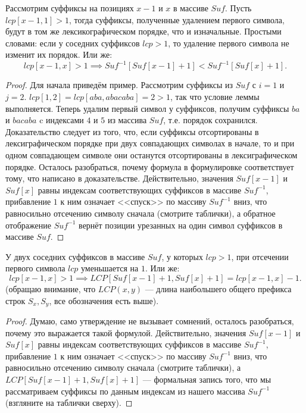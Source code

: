 \begin{enumerate}
       \begin{lemma}
               \label{3.2}
               Рассмотрим суффиксы на позициях $x-1$ и $x$ в массиве $Suf$. 
               Пусть $lcp[x-1, 1] > 1$, тогда суффиксы, полученные удалением первого 
               символа, будут в том же лексикографическом порядке, что и изначальные.
               Простыми словами: если у соседних суффиксов $lcp > 1$, то удаление первого символа не
               изменит их порядок. Или же:
               \[
                       lcp[x-1, x] > 1 \implies Suf^{-1}[Suf[x-1] + 1] < Suf^{-1}[Suf[x] + 1]
               .\] 
       \end{lemma}
       \begin{proof}
               Для начала приведём пример. Рассмотрим суффиксы из $Suf$ с $i = 1$ и $j = 2$. 
               $lcp[1, 2] = lcp[aba, abacaba] = 2 > 1$, так что условие леммы выполняется.
               Теперь удалим первый символ у суффиксов, получим суффиксы $ba$ и  $bacaba$ c индексами
               $4$ и $5$ из массива $Suf$, т.е. порядок сохранился. Доказательство следует из того, что, 
               если суффиксы отсортированы в лексиграфическом порядке при двух совпадающих символах в 
               начале, то и при одном совпадающем символе они останутся отсортированы в лексиграфическом
               порядке. Осталось разобраться, почему формула в формулировке соответствует тому, что
               написано в доказательстве. Действительно, значения $Suf[x-1]$ и $Suf[x]$ равны индексам
               соответствующих суффиксов в массиве  $Suf^{-1}$, прибавление $1$ к ним означает <<спуск>>
               по массиву $Suf^{-1}$ вниз, что равносильно отсечению символу сначала (смотрите таблички), а
               обратное отображение $Suf^{-1}$ вернёт позиции урезанных на один символ суффиксов в массиве
               $Suf$. 
       \end{proof}
       \begin{lemma}
               \label{3.3}
               У двух соседних суффиксов в массиве $Suf$, у которых $lcp > 1$, при отсечении первого символа
               $lcp$ уменьшается на $1$. Или же:
               \[
                       lcp[x-1, x] > 1 \implies LCP[Suf[x-1] + 1, Suf[x] + 1] = lcp[x-1, x] - 1
               .\] 
               (обращаю внимание, что $LCP(x, y)$ --- длина наибольшего общего префикса строк 
               $S_{x}, S_{y}$, все обозначения есть выше). 
       \end{lemma}
       \begin{proof}
               Думаю, само утверждение не вызывает сомнений, осталось разобраться, почему это выражается
               такой формулой.  
               Действительно, значения $Suf[x-1]$ и $Suf[x]$ равны индексам
               соответствующих суффиксов в массиве  $Suf^{-1}$, прибавление $1$ к ним означает <<спуск>>
               по массиву $Suf^{-1}$ вниз, что равносильно отсечению символу сначала (смотрите таблички), а
               $LCP[Suf[x-1] + 1, Suf[x] + 1]$ --- формальная запись того, что мы рассматриваем суффиксы
               по данным индексам из нашего массива $Suf^{-1}$ (взгляните на таблички сверху).
       \end{proof}
      

\end{enumerate}
